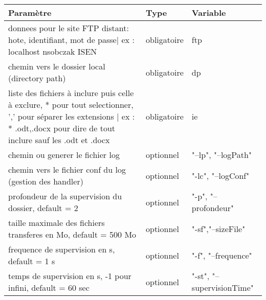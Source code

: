 \begin{tabular}{|R{8cm}|C{3cm}|L{3cm}|}
\hline {} Paramètre & Type &  Variable  \\
\hline  donnees pour le site FTP distant: hote, identifiant, mot de passe| ex : localhost nsobczak ISEN & obligatoire & ftp  \\
\hline  chemin vers le dossier local (directory path) & obligatoire & dp  \\
\hline  liste des fichiers à inclure puis celle à exclure, * pour tout selectionner, ',' pour séparer les extensions
| ex : * .odt,.docx pour dire de tout inclure sauf les .odt et .docx & obligatoire & ie  \\

\hline  chemin ou generer le fichier log & optionnel & "--lp", "--logPath"  \\
\hline  chemin vers le fichier conf du log (gestion des handler) & optionnel & "-lc", "--logConf"  \\
\hline  profondeur de la supervision du dossier, default = 2 & optionnel & "-p", "--profondeur"  \\
\hline  taille maximale des fichiers transferes en Mo, default = 500 Mo & optionnel & "-sf","--sizeFile"  \\
\hline  frequence de supervision en s, default = 1 s & optionnel & "-f", "--frequence"  \\
\hline  temps de supervision en s, -1 pour infini, default = 60 sec & optionnel & "-st", "--supervisionTime"  \\
\hline 
\end{tabular}

\begin{comment}
# obligatoire
PARSER.add_argument("ftp", type=str, nargs=3,
		    help="(hote, identifiant, mot_de_passe) :\n" + \
			  "donnees pour le site FTP distant: hote, identifiant, mot de passe" + \
			  "ex : localhost nsobczak ISEN")
PARSER.add_argument("dp", type=str, help="chemin vers le dossier local")
PARSER.add_argument("ie", type=str, nargs=2,
		    help="liste des fichiers à inclure puis celle à exclure, "
			  "* pour tout selectionner, ',' pour séparer les extensions"
			  "ex : * .odt,.docx pour dire de tout inclure sauf les .odt et .docx")

# optionnel
PARSER.add_argument("-lp", "--logPath", default="",
		    help="chemin ou generer le fichier log")
PARSER.add_argument("-lc", "--logConf", default="rsyncFTP.conf",
		    help="chemin vers le fichier conf du log (gestion des handler)")
PARSER.add_argument("-p", "--profondeur", default=5,
		    help="profondeur de la supervision du dossier, default = 2")
PARSER.add_argument("-sf", "--sizeFile", default=500,
		    help="taille maximale des fichiers transferes en Mo, default = 500 Mo")
PARSER.add_argument("-f", "--frequence", default=1,
		    help="frequence de supervision en s, default = 1 s")
PARSER.add_argument("-st", "--supervisionTime", default=-1,
		    help="temps de supervision en s, default = infinite")
\end{comment}


